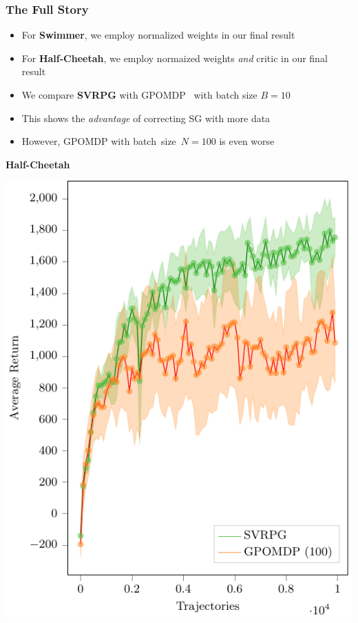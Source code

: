 \documentclass[aspectratio=169]{beamer}
\newcommand{\enb}[1]{\textcolor{poliblue1}{\textbf{#1}}}
\begin{document}
\begin{frame} 
\frametitle{The Full Story} 

\begin{minipage}[]{.45\paperwidth}
	\begin{itemize}
		\item For \textbf{Swimmer}, we employ normalized weights in our final result
		\item For \textbf{Half-Cheetah}, we employ normaized weights \textit{and} critic in our final result
		\item We compare \enb{SVRPG} with GPOMDP~\citep{baxter2001infinite} with batch size $B = 10$
		\item This shows the \textit{advantage} of 	correcting SG with more data
		\item However, GPOMDP with batch~size~$N = 100$ is even worse
	\end{itemize}
\end{minipage}
\hfill%
\begin{minipage}[]{.35\paperwidth}
	\begin{center}
	\textbf{Half-Cheetah}
\end{center}
\includegraphics[width=.9\textwidth]{images/cheetah100.pdf}
\end{minipage}

\end{frame}
\end{document}
